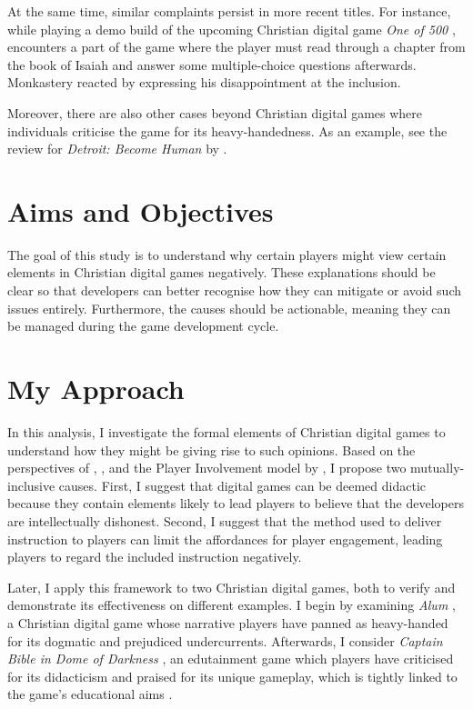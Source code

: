 At the same time, similar complaints persist in more recent titles. For instance, while playing a demo build of the upcoming Christian digital game \textit{One of 500} \parencite{lightword_productions_one_nd}, \textcite[23:28]{monkastery_new_2024} encounters a part of the game where the player must read through a chapter from the book of Isaiah and answer some multiple-choice questions afterwards. Monkastery reacted by expressing his disappointment at the inclusion.

Moreover, there are also other cases beyond Christian digital games where individuals criticise the game for its heavy-handedness. As an example, see the review for \textit{Detroit: Become Human} \parencite{cage_detroit_2018} by \textcite{obrien_detroit_2018}.

\section{Aims and Objectives} \label{sec:aims_and_objectives}

The goal of this study is to understand why certain players might view certain elements in Christian digital games negatively. These explanations should be clear so that developers can better recognise how they can mitigate or avoid such issues entirely. Furthermore, the causes should be actionable, meaning they can be managed during the game development cycle.

\section{My Approach} 

In this analysis, I investigate the formal elements of Christian digital games to understand how they might be giving rise to such opinions. Based on the perspectives of \textcite{king_virtue_2017}, \textcite{repp_whats_2012}, and the Player Involvement model by \textcite{calleja_in_game_2011}, I propose two mutually-inclusive causes. First, I suggest that digital games can be deemed didactic because they contain elements likely to lead players to believe that the developers are intellectually dishonest. Second, I suggest that the method used to deliver instruction to players can limit the affordances for player engagement, leading players to regard the included instruction negatively. 

Later, I apply this framework to two Christian digital games, both to verify and demonstrate its effectiveness on different examples. I begin by examining \textit{Alum} \parencite{orsie_alum_2006}, a Christian digital game whose narrative players have panned as heavy-handed for its dogmatic and prejudiced undercurrents. Afterwards, I consider \textit{Captain Bible in Dome of Darkness} \parencite{engelbrite_captain_1994}, an edutainment game which players have criticised for its didacticism \parencite{moon_channel_why_2023} and praised for its unique gameplay, which is tightly linked to the game's educational aims \parencite{censorious_idler_captain_2018}.

